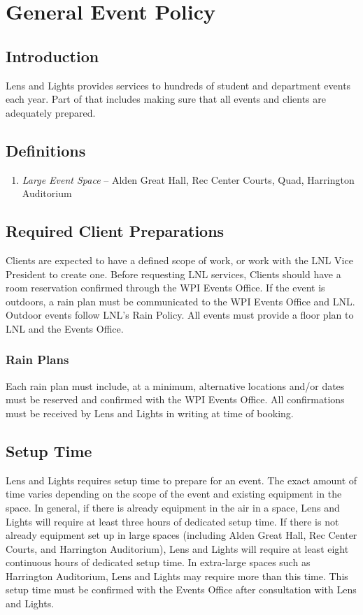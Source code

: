 \chapter{General Event Policy}

\section{Introduction}
Lens and Lights provides services to hundreds of student and department events
each year. Part of that includes making sure that all events and clients are
adequately prepared.

\section{Definitions}
\begin{enumerate}
    \item \emph{Large Event Space} -- Alden Great Hall, Rec Center Courts, Quad,
        Harrington Auditorium
\end{enumerate}

\section{Required Client Preparations}
Clients are expected to have a defined scope of work, or work with the LNL Vice
President to create one. Before requesting LNL services, Clients should have a
room reservation confirmed through the WPI Events Office. If the event is
outdoors, a rain plan must be communicated to the WPI Events Office and LNL.
Outdoor events follow LNL's Rain Policy. All events must provide a floor plan to
LNL and the Events Office.

\subsection{Rain Plans}

Each rain plan must include, at a minimum, alternative locations and/or dates
must be reserved and confirmed with the WPI Events Office. All confirmations
must be received by Lens and Lights in writing at time of booking.

\section{Setup Time}

Lens and Lights requires setup time to prepare for an event. The exact amount of
time varies depending on the scope of the event and existing equipment in the
space. In general, if there is already equipment in the air in a space, Lens and
Lights will require at least three hours of dedicated setup time. If there is
not already equipment set up in large spaces (including Alden Great Hall, Rec
Center Courts, and Harrington Auditorium), Lens and Lights will require at least
eight continuous hours of dedicated setup time. In extra-large spaces such as
Harrington Auditorium, Lens and Lights may require more than this time. This
setup time must be confirmed with the Events Office after consultation with Lens
and Lights.

